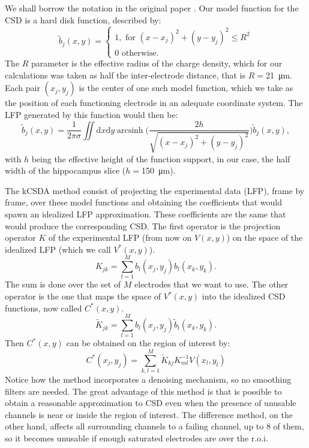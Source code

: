 \documentclass[letterpaper,12pts]{article}
\DeclareMathOperator{\arcsinh}{arcsinh}
\newcommand{\mum}[1]{\SI{#1}{\micro\metre}}
\newcommand{\rd}{\mathrm{d}}
\begin{document}
We shall borrow the notation in the original paper \cite{Potworowski2011}. Our model function for the CSD is a hard disk function, described by:
\begin{equation}
  \tilde{b}_j(x,y)=\begin{cases}
  1, \text{ for } (x-x_j)^2+(y-y_j)^2 \leq R^2 \\
  0 \text{ otherwise.} 
  \end{cases}
\end{equation}
The $R$ parameter is the effective radius of the charge density, which for our
calculations was taken as half the inter-electrode distance, that is $R=$\mum{21}.
Each pair $(x_j, y_j)$ is the center of one such model function, which we take as
the position of each  functioning electrode in an adequate coordinate system.
The LFP generated by this function would then be:
\begin{equation}
  \tilde{b}_j(x,y)=\frac{1}{2\pi\sigma}
  \iint \! \rd x \rd y \arcsinh \biggr(
  \frac{2 h } {\sqrt{(x-x_j)^2+(y-y_j)^2}}
  \biggl)
  \tilde{b}_j(x,y),
\end{equation}
  with $h$ being the effective height of the function support, in our case,
  the half width of the hippocampus slice ($h=$\mum{150}).

The kCSDA method consist of projecting the experimental data (LFP), frame by frame,
over these model functions and obtaining the  coefficients that would spawn an idealized
LFP approximation. These coefficients are the same that would produce the
corresponding CSD. The first operator is the projection operator $K$ of the experimental
LFP (from now on $V(x,y)$) on the space of the idealized LFP (which we call $V^* (x,y)$).
\begin{equation}
  K_{jk}=\sum_{l=1}^{M}b_l(x_j,y_j)b_l(x_k,y_k).
\end{equation}
The sum is done over the set of $M$ electrodes that we want to use.
The other operator is the one that maps the space of $V^*(x,y)$ into the idealized
CSD functions, now called $C^*(x,y)$. 
\begin{equation}
  \tilde{K}_{jk}=\sum_{l=1}^Mb_l(x_j,y_j)\tilde{b}_l(x_k,y_k).
\end{equation}
Then $C^*(x,y)$ can be obtained on the region of interest by:
\begin{equation}
  C^*(x_j,y_j)=\sum_{k,l=1}^M \tilde{K}_{kj} K^{-1}_{ml} V(x_l,y_l)
\end{equation}
Notice how the method incorporates a denoising mechanism, so
no smoothing filters are needed.
The great advantage of this method is that is possible to obtain a reasonable
approximation to CSD even when the presence of unusable channels is near or inside
the region of interest. The difference method, on the other hand, affects all surrounding
channels to a failing channel, up to 8 of them, so it becomes unusable if enough
saturated electrodes are over the r.o.i.
\end{document}
